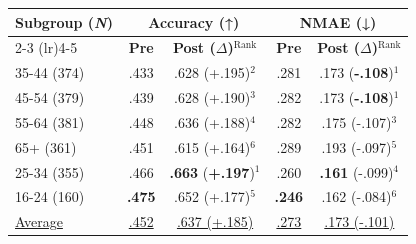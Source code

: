 \begin{tabular}{@{} l | c c | c c @{}}
\toprule
\multirow{2}{*}{\textbf{Subgroup (\textbf{\textit{N}})}} & \multicolumn{2}{c|}{\textbf{Accuracy (↑)}} & \multicolumn{2}{c}{\textbf{NMAE (↓)}} \\
\cmidrule(lr){2-3} \cmidrule(lr){4-5}
& \textbf{Pre} & \textbf{Post ($\Delta$)}$^{\text{Rank}}$ & \textbf{Pre} & \textbf{Post ($\Delta$)}$^{\text{Rank}}$ \\
\midrule
35-44 (374) & .433 & .628 (+.195)$^{2}$ & .281 & .173 (\textbf{-.108})$^{1}$ \\
45-54 (379) & .439 & .628 (+.190)$^{3}$ & .282 & .173 (\textbf{-.108})$^{1}$ \\
55-64 (381) & .448 & .636 (+.188)$^{4}$ & .282 & .175 (-.107)$^{3}$ \\
65+ (361) & .451 & .615 (+.164)$^{6}$ & .289 & .193 (-.097)$^{5}$ \\
25-34 (355) & .466 & \textbf{.663} (\textbf{+.197})$^{1}$ & .260 & \textbf{.161} (-.099)$^{4}$ \\
16-24 (160) & \textbf{.475} & .652 (+.177)$^{5}$ & \textbf{.246} & .162 (-.084)$^{6}$ \\
\midrule
\underline{Average} & \underline{.452} & \underline{.637 (+.185)} & \underline{.273} & \underline{.173 (-.101)} \\
\bottomrule
\end{tabular}

